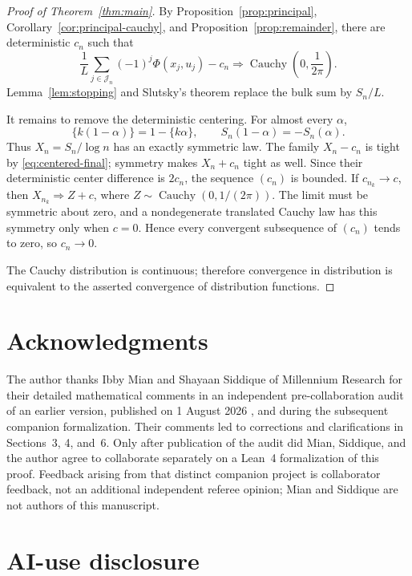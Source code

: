 \documentclass[11pt,a4paper]{amsart}
\theoremstyle{definition}
\theoremstyle{remark}
\begin{document}
\begin{proof}[Proof of Theorem~\ref{thm:main}]
By Proposition~\ref{prop:principal}, Corollary~\ref{cor:principal-cauchy},
and Proposition~\ref{prop:remainder}, there are deterministic $c_n$ such that
\begin{equation}\label{eq:centered-final}
 \frac1L\sum_{j\in\mathcal J_n}(-1)^j\Phi(x_j,u_j)-c_n
 \Longrightarrow \operatorname{Cauchy}\!\left(0,\frac1{2\pi}\right).
\end{equation}
Lemma~\ref{lem:stopping} and Slutsky's theorem replace the bulk sum by
$S_n/L$.

It remains to remove the deterministic centering.  For almost every
$\alpha$,
\[
 \{k(1-\alpha)\}=1-\{k\alpha\},
 \qquad S_n(1-\alpha)=-S_n(\alpha).
\]
Thus $X_n=S_n/\log n$ has an exactly symmetric law.  The family
$X_n-c_n$ is tight by \eqref{eq:centered-final}; symmetry makes
$X_n+c_n$ tight as well.  Since their deterministic center difference is
$2c_n$, the sequence $(c_n)$ is bounded.  If $c_{n_k}\to c$, then
$X_{n_k}\Rightarrow Z+c$, where
$Z\sim\operatorname{Cauchy}(0,1/(2\pi))$.  The limit must be symmetric about
zero, and a nondegenerate translated Cauchy law has this symmetry only when
$c=0$.  Hence every convergent subsequence of $(c_n)$ tends to zero, so
$c_n\to0$.

The Cauchy distribution is continuous; therefore convergence in distribution
is equivalent to the asserted convergence of distribution functions.
\end{proof}

\section*{Acknowledgments}

The author thanks Ibby Mian and Shayaan Siddique of Millennium Research for
their detailed mathematical comments in an independent pre-collaboration audit
of an earlier version, published on 1 August 2026 \cite{MianSiddique26}, and
during the subsequent companion formalization.  Their comments led to
corrections and clarifications in Sections~3, 4, and~6.  Only after publication
of the audit did Mian, Siddique, and the author agree to collaborate separately
on a Lean~4 formalization of this proof.  Feedback arising from that distinct
companion project is collaborator feedback, not an additional independent
referee opinion; Mian and Siddique are not authors of this manuscript.

\section*{AI-use disclosure}
\end{document}
